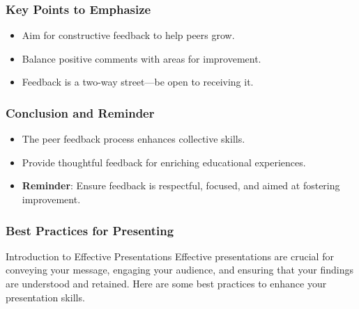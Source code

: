 \documentclass[aspectratio=169]{beamer}
\begin{document}
\begin{frame}[fragile]
    \frametitle{Key Points to Emphasize}
    \begin{itemize}
        \item Aim for constructive feedback to help peers grow.
        \item Balance positive comments with areas for improvement.
        \item Feedback is a two-way street—be open to receiving it.
    \end{itemize}
\end{frame}

\begin{frame}[fragile]
    \frametitle{Conclusion and Reminder}
    \begin{itemize}
        \item The peer feedback process enhances collective skills.
        \item Provide thoughtful feedback for enriching educational experiences.
        \item \textbf{Reminder}: Ensure feedback is respectful, focused, and aimed at fostering improvement.
    \end{itemize}
\end{frame}

\begin{frame}[fragile]
    \frametitle{Best Practices for Presenting}
    \begin{block}{Introduction to Effective Presentations}
        Effective presentations are crucial for conveying your message, engaging your audience, and ensuring that your findings are understood and retained.
        Here are some best practices to enhance your presentation skills.
    \end{block}
\end{frame}
\end{document}
